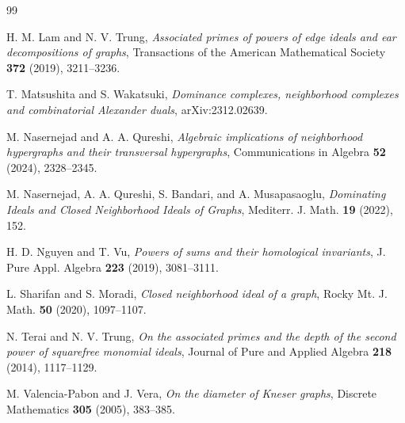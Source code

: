 \documentclass[12pt,reqno,twoside]{amsart}
\theoremstyle{definition}
\theoremstyle{plain}
\theoremstyle{remark}
\numberwithin{equation}{section}
\begin{document}
\begin{thebibliography}{99}
 
H. M. Lam and N. V. Trung,
{\em Associated primes of powers of edge ideals and ear decompositions of graphs}, Transactions of the American Mathematical Society {\bf 372} (2019), 3211--3236.


T. Matsushita and S. Wakatsuki,
{\it Dominance complexes, neighborhood complexes and combinatorial Alexander duals}, arXiv:2312.02639. 

 M. Nasernejad and A. A. Qureshi, \emph{Algebraic implications of neighborhood hypergraphs and their transversal hypergraphs}, Communications in Algebra {\bf 52} (2024), 2328--2345.
 
M. Nasernejad, A. A. Qureshi, S. Bandari, and A. Musapasaoglu,
{\em Dominating Ideals and Closed Neighborhood Ideals of Graphs}, Mediterr. J. Math. {\bf 19} (2022), 152.


H. D. Nguyen and T. Vu,
{\em Powers of sums and their homological invariants}, J. Pure Appl. Algebra {\bf 223} (2019), 3081--3111.


L. Sharifan and S. Moradi,
\emph{Closed neighborhood ideal of a graph}, Rocky Mt. J. Math. {\bf 50} (2020), 1097--1107.


 
N. Terai and N. V. Trung,
\emph{On the associated primes and the depth of the second power of squarefree monomial ideals}, Journal of Pure and Applied Algebra {\bf 218} (2014), 1117--1129.



M. Valencia-Pabon and J. Vera,
\emph{On the diameter of Kneser graphs}, Discrete Mathematics {\bf 305} (2005), 383--385.



\end{thebibliography}
\end{document}
